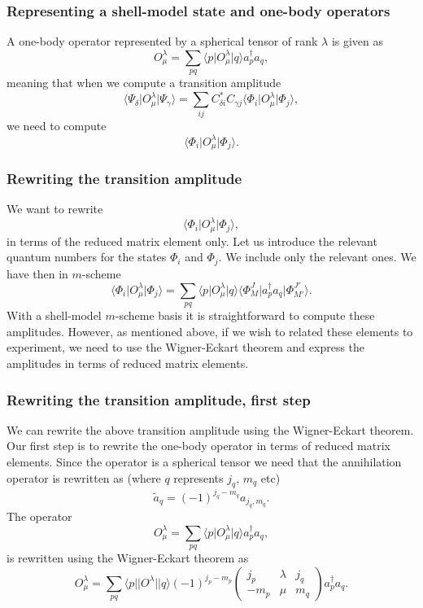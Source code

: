 \documentclass{beamer}
\begin{document}
\begin{frame}
\frametitle{Representing a shell-model state and one-body operators}

\begin{block}{}
A one-body operator represented by a spherical tensor of rank $\lambda$ is given as 
\[
O_{\mu}^{\lambda} = \sum_{pq} \langle p \vert O_{\mu}^{\lambda} \vert q \rangle a^{\dagger}_pa_q,
\]
meaning that when we compute a transition amplitude 
\[
\langle \Psi_{\delta} \vert   O_{\mu}^{\lambda}  \vert \Psi_{\gamma} \rangle = \sum_{ij} C^{*}_{\delta i} C_{\gamma j}  \langle \Phi_i \vert O_{\mu}^{\lambda} \vert \Phi_j\rangle,
\]
we need to compute 
\[
\langle \Phi_i \vert O_{\mu}^{\lambda} \vert \Phi_j\rangle.
\]
\end{block}
\end{frame}

\begin{frame}
\frametitle{Rewriting the transition amplitude}

\begin{block}{}
We want to rewrite 
\[
\langle \Phi_i \vert O_{\mu}^{\lambda} \vert \Phi_j\rangle, 
\]
in terms of the reduced matrix element only. 
Let us introduce the relevant quantum numbers for the states $\Phi_i$ and $\Phi_j$. We include only the relevant ones. We have then in $m$-scheme
\[
\langle \Phi_i \vert O_{\mu}^{\lambda} \vert \Phi_j\rangle = \sum_{pq} \langle p \vert O_{\mu}^{\lambda} \vert q \rangle \langle \Phi_{M}^{J} \vert a^{\dagger}_pa_q \vert \Phi_{M'}^{J'}\rangle.
\]
With a shell-model $m$-scheme basis it is straightforward to compute these amplitudes. 
However, as mentioned above, if we wish to related these elements to experiment, we need to use the Wigner-Eckart theorem and express the amplitudes in terms of reduced matrix elements.
\end{block}
\end{frame}

\begin{frame}
\frametitle{Rewriting the transition amplitude, first step}

\begin{block}{}
We can rewrite the above transition amplitude using the Wigner-Eckart theorem. Our first step
is to rewrite the one-body operator in terms of reduced matrix elements. Since the operator is a spherical tensor we need that the annihilation operator is rewritten as (where $q$ represents $j_q$, $m_q$ etc)
\[
\tilde{a}_q=\left(-1\right)^{j_q-m_q}a_{j_q,m_q}.
\]
The operator 
\[
O_{\mu}^{\lambda} = \sum_{pq} \langle p \vert O_{\mu}^{\lambda} \vert q \rangle a^{\dagger}_pa_q,
\]
is rewritten using the Wigner-Eckart theorem as 
\[
O_{\mu}^{\lambda} = \sum_{pq} \langle p \vert \vert O^{\lambda}\vert \vert q \rangle (-1)^{j_p-m_p}\left(\begin{array}{ccc}  j_p & \lambda & j_q \\ -m_p & \mu & m_q\end{array}\right)a^{\dagger}_pa_q.
\]
\end{block}
\end{frame}
\end{document}
